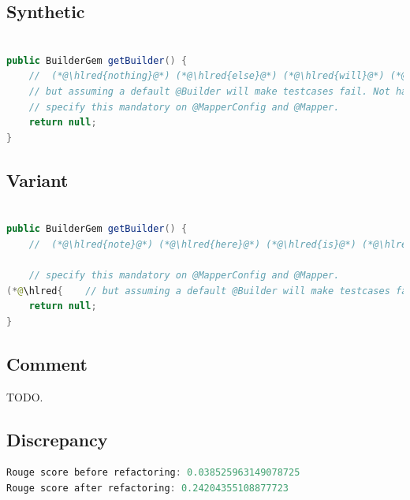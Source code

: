 \documentclass[usenames,dvipsnames]{article} %
\DeclareRobustCommand{\hlred}[1]{{\sethlcolor{pink}\hl{#1}}}
\begin{document}
\subsection{Synthetic}

\begin{lstlisting}[language=java]

public BuilderGem getBuilder() {
    //  (*@\hlred{nothing}@*) (*@\hlred{else}@*) (*@\hlred{will}@*) (*@\hlred{do}@*) it (*@\hlred{automatically}@*)
    // but assuming a default @Builder will make testcases fail. Not having a default means that you need to
    // specify this mandatory on @MapperConfig and @Mapper.
    return null;
}
\end{lstlisting}

\subsection{Variant}

\begin{lstlisting}[language=java]

public BuilderGem getBuilder() {
    //  (*@\hlred{note}@*) (*@\hlred{here}@*) (*@\hlred{is}@*) (*@\hlred{that}@*) (*@\hlred{developers}@*) (*@\hlred{could}@*) (*@\hlred{instead}@*) (*@\hlred{have}@*) (*@\hlred{more}@*) (*@\hlred{information}@*) (*@\hlred{that}@*) (*@\hlred{should}@*) (*@\hlred{not}@*) (*@\hlred{need}@*) (*@\hlred{builder}@*) (*@\hlred{information}@*) (*@\hlred{and}@*) (*@\hlred{should}@*) (*@\hlred{also}@*)

    // specify this mandatory on @MapperConfig and @Mapper.
(*@\hlred{    // but assuming a default @Builder will make testcases fail. Not having a default means that you need to}@*)
    return null;
}
\end{lstlisting}

\subsection{Comment}

TODO.

\subsection{Discrepancy}

\begin{lstlisting}[language=java]
Rouge score before refactoring: 0.038525963149078725
Rouge score after refactoring: 0.24204355108877723
\end{lstlisting}
\end{document}
